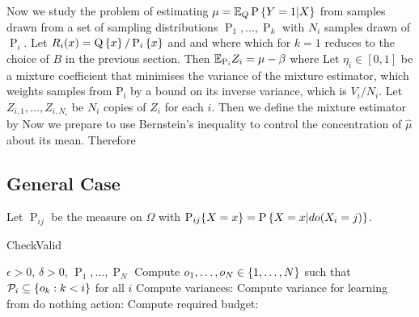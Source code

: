 Now we study the problem of estimating $\mu = \mathbb E_Q \operatorname{P}\left\{Y = 1|X\right\}$ from samples drawn
from a set of sampling distributions $\operatorname{P}_1,\ldots,\operatorname{P}_k$ with $N_i$ samples
drawn of $\operatorname{P}_i$.
Let $R_i(x) = \operatorname{Q}\left\{x\right\} / \operatorname{P}_{i}\left\{x\right\}$ and
and
where
which for $k = 1$ reduces to the choice of $B$ in the previous section.
Then $\mathbb E_{\operatorname{P_i}} Z_i = \mu - \beta$ where
Let $\eta_i \in [0,1]$ be a mixture coefficient that minimises the variance of the mixture 
estimator, which weights samples from $\operatorname{P_i}$ by a bound on its inverse variance, which is $V_i / N_i$.
Let $Z_{i,1},\ldots,Z_{i,N_i}$ be $N_i$ copies of $Z_i$ for each $i$.
Then we define the mixture estimator by
Now we prepare to use Bernstein's inequality to control the concentration of $\hat \mu$ about its mean.
Therefore


\subsection*{General Case}


Let $\operatorname P_{ij}$ be the measure on $\Omega$ with $\operatorname{P}_{ij}\!\left\{X = x\right\} = \operatorname{P}\left\{X = x|do(X_i = j)\right\}$.

\begin{algorithm}[H]
\caption{CheckValid}\label{alg:alloc}
\begin{algorithmic}
 $\epsilon > 0$, $\delta > 0$, $\operatorname P_1,\ldots,\operatorname P_N$
\STATE Compute $o_1,\ldots,o_N \in \left\{1,\ldots,N\right\}$ such that $\mathcal P_i \subseteq \left\{o_k : k < i\right\}$ for all $i$
\STATE Compute variances:
\STATE Compute variance for learning from do nothing action:
\STATE Compute required budget: 
\ENDFOR
{}
\ELSE
{}
\ENDIF
\end{algorithmic}
\end{algorithm}


